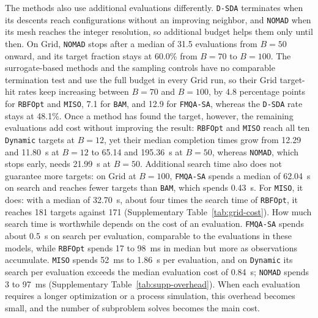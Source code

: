 \documentclass{article}
\begin{document}
The methods also use additional evaluations differently.
\texttt{D-SDA} terminates when its descents reach configurations without an improving neighbor, and \texttt{NOMAD} when its mesh reaches the integer resolution, so additional budget helps them only until then.
On Grid, \texttt{NOMAD} stops after a median of 31.5 evaluations from \(B=50\) onward, and its target fraction stays at 60.0\% from \(B=70\) to \(B=100\).
The surrogate-based methods and the sampling controls have no comparable termination test and use the full budget in every Grid run, so their Grid target-hit rates keep increasing between \(B=70\) and \(B=100\), by 4.8 percentage points for \texttt{RBFOpt} and \texttt{MISO}, 7.1 for \texttt{BAM}, and 12.9 for \texttt{FMQA-SA}, whereas the \texttt{D-SDA} rate stays at 48.1\%.
Once a method has found the target, however, the remaining evaluations add cost without improving the result: \texttt{RBFOpt} and \texttt{MISO} reach all ten \texttt{Dynamic} targets at \(B=12\), yet their median completion times grow from 12.29 and 11.80~s at \(B=12\) to 65.14 and 195.36~s at \(B=50\), whereas \texttt{NOMAD}, which stops early, needs 21.99~s at \(B=50\).
Additional search time also does not guarantee more targets: on Grid at \(B=100\), \texttt{FMQA-SA} spends a median of 62.04~s on search and reaches fewer targets than \texttt{BAM}, which spends 0.43~s.
For \texttt{MISO}, it does: with a median of 32.70~s, about four times the search time of \texttt{RBFOpt}, it reaches 181 targets against 171 (Supplementary Table~\ref{tab:grid-cost}).
How much search time is worthwhile depends on the cost of an evaluation.
\texttt{FMQA-SA} spends about 0.5~s on search per evaluation, comparable to the evaluations in these models, while \texttt{RBFOpt} spends 17 to 98~ms in median but more as observations accumulate.
\texttt{MISO} spends 52~ms to 1.86~s per evaluation, and on \texttt{Dynamic} its search per evaluation exceeds the median evaluation cost of 0.84~s; \texttt{NOMAD} spends 3 to 97~ms (Supplementary Table~\ref{tab:supp-overhead}).
When each evaluation requires a longer optimization or a process simulation, this overhead becomes small, and the number of subproblem solves becomes the main cost.
\end{document}
